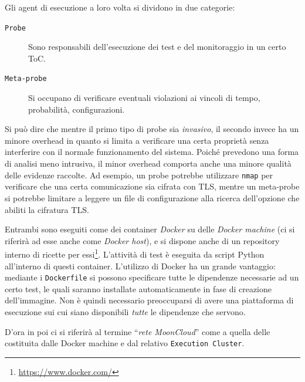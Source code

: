 Gli agent di esecuzione a loro volta si dividono in due categorie:
\begin{description}
	\item[\texttt{Probe}]Sono responsabili dell'esecuzione dei test e del
	monitoraggio in un certo ToC.
	\item[\texttt{Meta-probe}]Si occupano di verificare eventuali violazioni ai
	vincoli di tempo, probabilità, configurazioni. 
\end{description}
Si può dire che mentre il primo tipo di probe sia \textit{invasivo}, il secondo invece
ha un minore overhead in quanto si limita a verificare una certa proprietà
senza interferire con il normale funzionamento del sistema.
Poiché prevedono una forma di analisi meno intrusiva, il minor overhead comporta
anche una minore qualità delle evidenze raccolte.
Ad esempio, un probe potrebbe utilizzare \texttt{nmap} per verificare che
una certa comunicazione sia cifrata con TLS, mentre un meta-probe si
potrebbe limitare a leggere un file di configurazione alla ricerca dell'opzione
che abiliti la cifratura TLS.

Entrambi sono eseguiti come dei container \textit{Docker} su delle \textit{Docker machine}
(ci si riferirà ad esse anche come \textit{Docker host}),
e si dispone anche di un repository interno di ricette per essi\footnote{\url{https://www.docker.com/}}.
L'attività di test è eseguita da script Python all'interno di questi container.
L'utilizzo di Docker ha un grande vantaggio: mediante i \texttt{Dockerfile} si possono
specificare tutte le dipendenze necessarie ad un certo test, le quali saranno
installate automaticamente in fase di creazione dell'immagine. Non è quindi necessario
preoccuparsi di avere una piattaforma di esecuzione sui cui siano disponibili \textit{tutte}
le dipendenze che servono.

D'ora in poi ci si riferirà al termine ``\textit{rete MoonCloud}'' come a quella
delle costituita dalle Docker machine e dal relativo \texttt{Execution Cluster}.